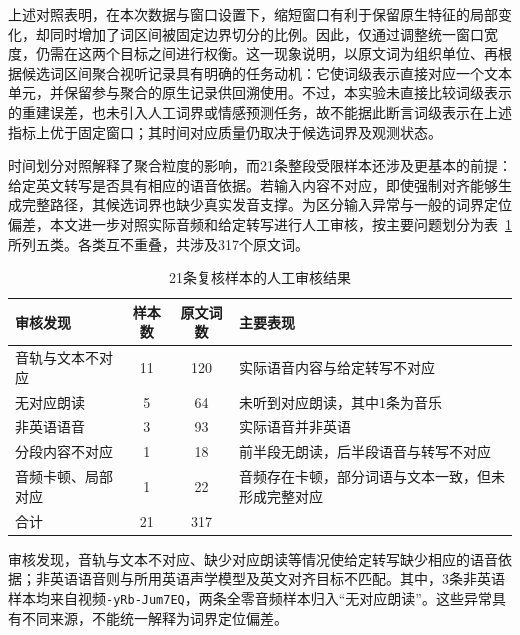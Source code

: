 上述对照表明，在本次数据与窗口设置下，缩短窗口有利于保留原生特征的局部变化，却同时增加了词区间被固定边界切分的比例。因此，仅通过调整统一窗口宽度，仍需在这两个目标之间进行权衡。这一现象说明，以原文词为组织单位、再根据候选词区间聚合视听记录具有明确的任务动机：它使词级表示直接对应一个文本单元，并保留参与聚合的原生记录供回溯使用。不过，本实验未直接比较词级表示的重建误差，也未引入人工词界或情感预测任务，故不能据此断言词级表示在上述指标上优于固定窗口；其时间对应质量仍取决于候选词界及观测状态。

时间划分对照解释了聚合粒度的影响，而21条整段受限样本还涉及更基本的前提：给定英文转写是否具有相应的语音依据。若输入内容不对应，即使强制对齐能够生成完整路径，其候选词界也缺少真实发音支撑。为区分输入异常与一般的词界定位偏差，本文进一步对照实际音频和给定转写进行人工审核，按主要问题划分为表~\ref{tab:p1_manual_review}所列五类。各类互不重叠，共涉及317个原文词。

\begin{table}[H]
    \centering\small
    \caption{21条复核样本的人工审核结果}
    \label{tab:p1_manual_review}
    \setlength{\tabcolsep}{6pt}
    \renewcommand{\arraystretch}{1.12}
    \ifdefined\pOneCompactTableBox\else\newsavebox{\pOneCompactTableBox}\fi
    \begin{lrbox}{\pOneCompactTableBox}
    \begin{tabular}{lcc>{\raggedright\arraybackslash}p{18em}}
        \toprule
        审核发现 & 样本数 & 原文词数 & 主要表现\\
        \midrule
        音轨与文本不对应 & 11 & 120 & 实际语音内容与给定转写不对应\\
        无对应朗读 & 5 & 64 & 未听到对应朗读，其中1条为音乐\\
        非英语语音 & 3 & 93 & 实际语音并非英语\\
        分段内容不对应 & 1 & 18 & 前半段无朗读，后半段语音与转写不对应\\
        音频卡顿、局部对应 & 1 & 22 & 音频存在卡顿，部分词语与文本一致，但未形成完整对应\\
        \midrule
        合计 & 21 & 317 & \\
        \bottomrule
    \end{tabular}
    \end{lrbox}
    \usebox{\pOneCompactTableBox}
\end{table}

审核发现，音轨与文本不对应、缺少对应朗读等情况使给定转写缺少相应的语音依据；非英语语音则与所用英语声学模型及英文对齐目标不匹配。其中，3条非英语样本均来自视频\nolinkurl{-yRb-Jum7EQ}，两条全零音频样本归入“无对应朗读”。这些异常具有不同来源，不能统一解释为词界定位偏差。

